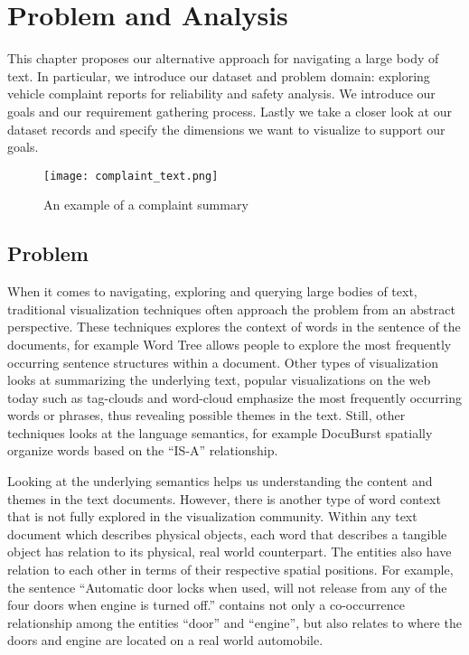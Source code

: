 %

\chapter{Problem and Analysis}
This chapter proposes our alternative approach for navigating a large body of
text. In particular, we introduce our dataset and problem domain: exploring 
vehicle complaint reports for reliability and safety analysis. We introduce our
goals and our requirement gathering process. Lastly we take a closer look at
our dataset records and specify the dimensions we want to visualize to support
our goals.

	\begin{figure}
	   \centering  
	   \texttt{[image: complaint\_text.png]}
	   \caption{An example of a complaint summary}
	   \label{figure:complaint}
	\end{figure}


\section{Problem}
When it comes to navigating, exploring and querying large bodies of text,
traditional visualization techniques often approach the problem from an abstract
perspective. These techniques explores the context of words in the sentence of
the documents, for example Word Tree \cite{Wattenberg2008} allows people to
explore the most frequently occurring sentence structures within a document.
Other types of visualization looks at summarizing the underlying text, popular 
visualizations on the web today such as tag-clouds and word-cloud emphasize
the most frequently occurring words or phrases, thus revealing possible themes in
the text. Still, other techniques looks at the language semantics, for example 
DocuBurst \cite{COL2009a} spatially organize words based on the ``IS-A'' relationship.

Looking at the underlying semantics helps us understanding the content and 
themes in the text documents. However, there is another type of word context 
that is not fully explored in the visualization community. Within any text 
document which describes physical objects, each word that describes a 
tangible object has relation to its physical, real world counterpart. The 
entities also have relation to each other in terms of their respective 
spatial positions. For example, the sentence ``Automatic door locks when 
used, will not release from any of the four doors when engine is turned off.'' 
contains not only a co-occurrence relationship among the entities ``door'' and 
``engine'', but also relates to where the doors and engine are located on a 
real world automobile.

